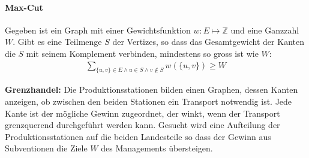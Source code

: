 \paragraph{Max-Cut} Gegeben ist ein Graph mit einer Gewichtsfunktion \(w: E \mapsto \mathbb{Z}\) und eine Ganzzahl \(W\). Gibt es eine Teilmenge \(S\) der Vertizes, so dass das Gesamtgewicht der Kanten die \(S\) mit seinem Komplement verbinden, mindestens so gross ist wie \(W\):
\begin{align*}
    \sum_{\{u,v\}\in E \wedge u \in S \wedge v \notin S} w(\{u,v\}) \geq W
\end{align*}
\textbf{Grenzhandel:} Die Produktionsstationen bilden einen Graphen, dessen Kanten anzeigen, ob zwischen den beiden Stationen ein Transport notwendig ist. Jede Kante ist der mögliche Gewinn zugeordnet, der winkt, wenn der Transport grenzquerend durchgeführt werden kann. Gesucht wird eine Aufteilung der Produktionsstationen auf die beiden Landesteile so dass der Gewinn aus Subventionen die Ziele \(W\) des Managements übersteigen.
